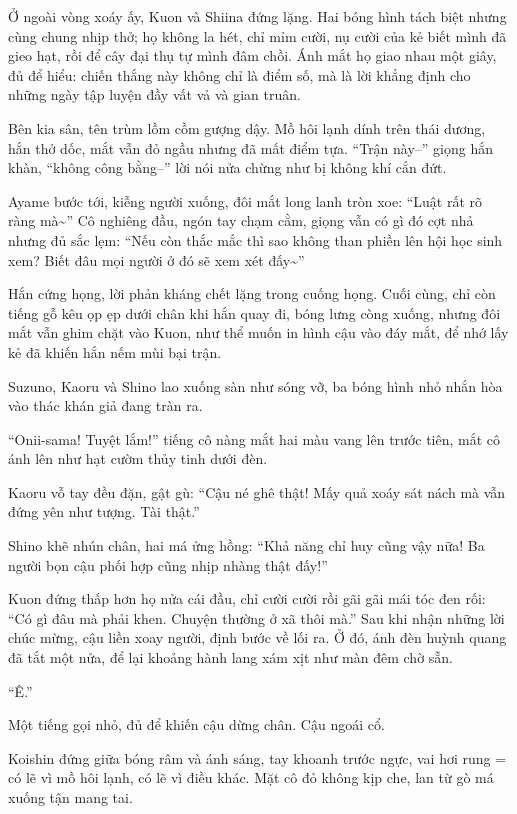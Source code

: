 \documentclass[../main.tex]{subfiles}
\begin{document}
Ở ngoài vòng xoáy ấy, Kuon và Shiina đứng lặng. Hai bóng hình tách biệt nhưng cùng chung nhịp thở; họ không la hét, chỉ mỉm cười, nụ cười của kẻ biết mình đã gieo hạt, rồi để cây đại thụ tự mình đâm chồi. Ánh mắt họ giao nhau một giây, đủ để hiểu: chiến thắng này không chỉ là điểm số, mà là lời khẳng định cho những ngày tập luyện đầy vất vả và gian truân.

Bên kia sân, tên trùm lồm cồm gượng dậy. Mồ hôi lạnh dính trên thái dương, hắn thở dốc, mắt vẫn đỏ ngầu nhưng đã mất điểm tựa. ``Trận này--'' giọng hắn khàn, ``không công bằng--'' lời nói nửa chừng như bị không khí cắn đứt.

Ayame bước tới, kiễng người xuống, đôi mắt long lanh tròn xoe: ``Luật rất rõ ràng mà\~{}'' Cô nghiêng đầu, ngón tay chạm cằm, giọng vẫn có gì đó cợt nhả nhưng đủ sắc lẹm: ``Nếu còn thắc mắc thì sao không than phiền lên hội học sinh xem? Biết đâu mọi người ở đó sẽ xem xét đấy\~{}''

Hắn cứng họng, lời phản kháng chết lặng trong cuống họng. Cuối cùng, chỉ còn tiếng gỗ kêu ọp ẹp dưới chân khi hắn quay đi, bóng lưng còng xuống, nhưng đôi mắt vẫn ghim chặt vào Kuon, như thể muốn in hình cậu vào đáy mắt, để nhớ lấy kẻ đã khiến hắn nếm mùi bại trận.

Suzuno, Kaoru và Shino lao xuống sàn như sóng vỡ, ba bóng hình nhỏ nhắn hòa vào thác khán giả đang tràn ra.

``Onii-sama! Tuyệt lắm!'' tiếng cô nàng mắt hai màu vang lên trước tiên, mắt cô ánh lên như hạt cườm thủy tinh dưới đèn.

Kaoru vỗ tay đều đặn, gật gù: ``Cậu né ghê thật! Mấy quả xoáy sát nách mà vẫn đứng yên như tượng. Tài thật.''

Shino khẽ nhún chân, hai má ửng hồng: ``Khả năng chỉ huy cũng vậy nữa! Ba người bọn cậu phối hợp cũng nhịp nhàng thật đấy!''

Kuon đứng thấp hơn họ nửa cái đầu, chỉ cười cười rồi gãi gãi mái tóc đen rối: ``Có gì đâu mà phải khen. Chuyện thường ở xã thôi mà.'' Sau khi nhận những lời chúc mừng, cậu liền xoay người, định bước về lối ra. Ở đó, ánh đèn huỳnh quang đã tắt một nửa, để lại khoảng hành lang xám xịt như màn đêm chờ sẵn.

``Ê.''

Một tiếng gọi nhỏ, đủ để khiến cậu dừng chân. Cậu ngoái cổ.

Koishin đứng giữa bóng râm và ánh sáng, tay khoanh trước ngực, vai hơi rung = có lẽ vì mồ hôi lạnh, có lẽ vì điều khác. Mặt cô đỏ không kịp che, lan từ gò má xuống tận mang tai.
\end{document}
